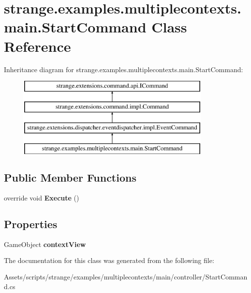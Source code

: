 \hypertarget{classstrange_1_1examples_1_1multiplecontexts_1_1main_1_1_start_command}{\section{strange.\-examples.\-multiplecontexts.\-main.\-Start\-Command Class Reference}
\label{classstrange_1_1examples_1_1multiplecontexts_1_1main_1_1_start_command}
}
Inheritance diagram for strange.\-examples.\-multiplecontexts.\-main.\-Start\-Command\-:\begin{figure}[H]
\begin{center}
\leavevmode
\includegraphics[height=4.000000cm]{classstrange_1_1examples_1_1multiplecontexts_1_1main_1_1_start_command}
\end{center}
\end{figure}
\subsection*{Public Member Functions}
\begin{DoxyCompactItemize}
\item 
\hypertarget{classstrange_1_1examples_1_1multiplecontexts_1_1main_1_1_start_command_a6eca6d358a1f80735e1b27a97c1a7c38}{override void {\bfseries Execute} ()}\label{classstrange_1_1examples_1_1multiplecontexts_1_1main_1_1_start_command_a6eca6d358a1f80735e1b27a97c1a7c38}

\end{DoxyCompactItemize}
\subsection*{Properties}
\begin{DoxyCompactItemize}
\item 
\hypertarget{classstrange_1_1examples_1_1multiplecontexts_1_1main_1_1_start_command_a5c91ecb5114a71d06e8051475a03b692}{Game\-Object {\bfseries context\-View}}\label{classstrange_1_1examples_1_1multiplecontexts_1_1main_1_1_start_command_a5c91ecb5114a71d06e8051475a03b692}

\end{DoxyCompactItemize}


The documentation for this class was generated from the following file\-:\begin{DoxyCompactItemize}
\item 
Assets/scripts/strange/examples/multiplecontexts/main/controller/Start\-Command.\-cs\end{DoxyCompactItemize}
